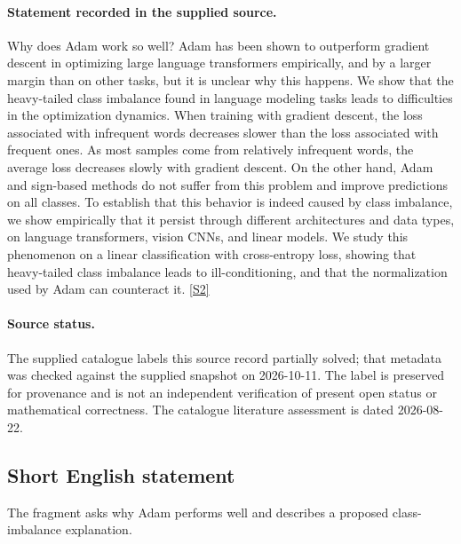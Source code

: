 \documentclass[11pt]{article}
\begin{document}
\paragraph{Statement recorded in the supplied source.}
Why does Adam work so well? Adam has been shown to outperform gradient descent in optimizing large language transformers empirically, and by a larger margin than on other tasks, but it is unclear why this happens. We show that the heavy-tailed class imbalance found in language modeling tasks leads to difficulties in the optimization dynamics. When training with gradient descent, the loss associated with infrequent words decreases slower than the loss associated with frequent ones. As most samples come from relatively infrequent words, the average loss decreases slowly with gradient descent. On the other hand, Adam and sign-based methods do not suffer from this problem and improve predictions on all classes. To establish that this behavior is indeed caused by class imbalance, we show empirically that it persist through different architectures and data types, on language transformers, vision CNNs, and linear models. We study this phenomenon on a linear classification with cross-entropy loss, showing that heavy-tailed class imbalance leads to ill-conditioning, and that the normalization used by Adam can counteract it. \href{https://doi.org/10.4171/owr/2025/4}{[S2]}
\paragraph{Source status.}
The supplied catalogue labels this source record partially solved; that metadata was checked against the supplied snapshot on 2026-10-11. The label is preserved for provenance and is not an independent verification of present open status or mathematical correctness. The catalogue literature assessment is dated 2026-08-22.
\subsection{Short English statement}
The fragment asks why Adam performs well and describes a proposed class-imbalance explanation.
\end{document}
